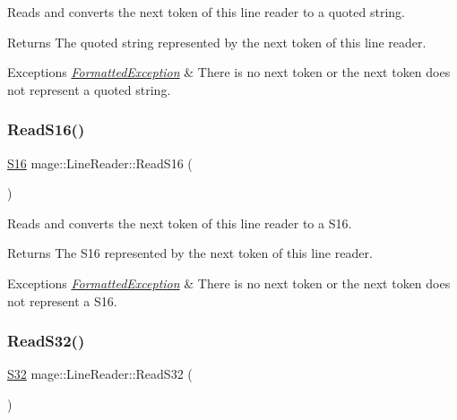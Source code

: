 Reads and converts the next token of this line reader to a quoted string.

\begin{DoxyReturn}{Returns}
The quoted string represented by the next token of this line reader. 
\end{DoxyReturn}

\begin{DoxyExceptions}{Exceptions}
{\em \hyperlink{classmage_1_1_formatted_exception}{Formatted\+Exception}} & There is no next token or the next token does not represent a quoted string. \\
\hline
\end{DoxyExceptions}
\hypertarget{classmage_1_1_line_reader_a9f3ca4ad3606d9b67a90698c2b71bdd0}{}\label{classmage_1_1_line_reader_a9f3ca4ad3606d9b67a90698c2b71bdd0} 
\subsubsection{\texorpdfstring{Read\+S16()}{ReadS16()}}
{\footnotesize\ttfamily \hyperlink{namespacemage_add9d3fe59b2a338108e98fcd67507005}{S16} mage\+::\+Line\+Reader\+::\+Read\+S16 (\begin{DoxyParamCaption}{ }\end{DoxyParamCaption})\hspace{0.3cm}{\ttfamily [protected]}}

Reads and converts the next token of this line reader to a {\ttfamily S16}.

\begin{DoxyReturn}{Returns}
The {\ttfamily S16} represented by the next token of this line reader. 
\end{DoxyReturn}

\begin{DoxyExceptions}{Exceptions}
{\em \hyperlink{classmage_1_1_formatted_exception}{Formatted\+Exception}} & There is no next token or the next token does not represent a {\ttfamily S16}. \\
\hline
\end{DoxyExceptions}
\hypertarget{classmage_1_1_line_reader_ad3218e41f29c2c3979d1be439835c72d}{}\label{classmage_1_1_line_reader_ad3218e41f29c2c3979d1be439835c72d} 
\subsubsection{\texorpdfstring{Read\+S32()}{ReadS32()}}
{\footnotesize\ttfamily \hyperlink{namespacemage_a642e05c5c83642b6946703615cdbf2da}{S32} mage\+::\+Line\+Reader\+::\+Read\+S32 (\begin{DoxyParamCaption}{ }\end{DoxyParamCaption})\hspace{0.3cm}{\ttfamily [protected]}}

